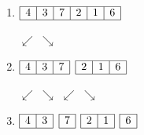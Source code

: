 \documentclass[12pt, letterpaper]{article}
\begin{document}
\begin{minipage}{0.8\textwidth}
	\begin{enumerate}
		\item 
		$\begin{array}{|l|c|c|c|c|r|}
			\hline
			4 & 3 & 7 & 2 & 1 & 6 \\
			\hline
		\end{array}$
		
		\hspace{0.5cm}$\swarrow$
		\hspace{1.5cm}$\searrow$
		\item 
		$\begin{array}{|l|c|r|}
			\hline
			4 & 3 & 7 \\
			\hline
		\end{array}$
		$\begin{array}{|l|c|r|}
			\hline
			2 & 1 & 6 \\
			\hline
		\end{array}$
		
		\hspace{0.2cm}$\swarrow$
		\hspace{0.3cm}$\searrow$
		\hspace{0.6cm}$\swarrow$
		\hspace{0.1cm}$\searrow$
		\item
		$\begin{array}{|l|r|}
			\hline
			4 & 3 \\
			\hline
		\end{array}$
		$\begin{array}{|c|}
			\hline
			7 \\
			\hline
		\end{array}$
		$\begin{array}{|l|r|}
			\hline
			2 & 1 \\
			\hline
		\end{array}$
		$\begin{array}{|c|}
			\hline
			6 \\
			\hline
		\end{array}$
		

\end{enumerate}
\end{minipage}
\end{document}

